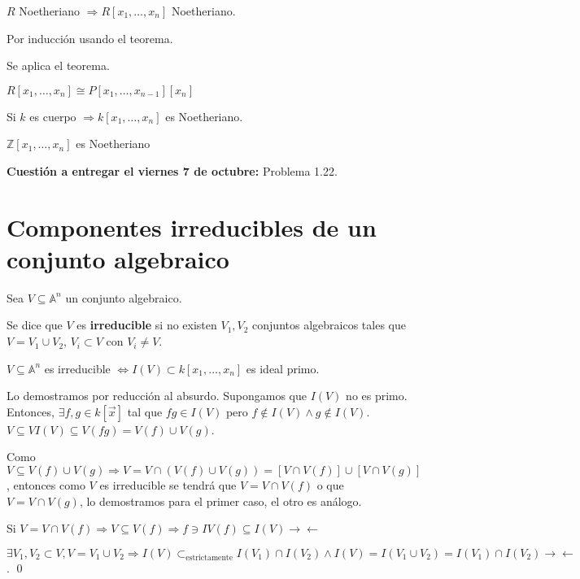 \begin{Cor}
$R$ Noetheriano $\Rightarrow R[x_1,\dots,x_n]$ Noetheriano.
\end{Cor}

\begin{Dem}
Por inducción usando el teorema.

 Se aplica el teorema.

 $R[x_1,\dots, x_n] \cong P[x_1,\dots , x_{n-1}][x_n]$
\end{Dem}

\begin{Cor}
Si $k$ es cuerpo $\Rightarrow k[x_1,\dots ,x_n]$ es Noetheriano.
\end{Cor}

\begin{Cor}
$\mathbb{Z}[x_1,\dots , x_n]$ es Noetheriano
\end{Cor}

\textbf{Cuestión a entregar el viernes 7 de octubre:} Problema 1.22.


\section{Componentes irreducibles de un conjunto algebraico}

Sea $V\subseteq \mathbb{A}^n$ un  conjunto algebraico.


\begin{Def}
Se dice que $V$ es \textbf{irreducible} si no existen $V_1,V_2$ conjuntos algebraicos tales que $V=V_1\cup V_2$, $V_i\subset V$ con $V_i \neq V$.
\end{Def}

\begin{Prop}
$V\subseteq \mathbb{A}^n$ es irreducible $\Leftrightarrow I(V)\subset k[x_1,\dots ,x_n]$ es ideal primo.
\end{Prop}

\begin{Dem}
\framebox{$\Rightarrow$}


Lo demostramos por reducción al absurdo. Supongamos que $I(V)$ no es primo. Entonces, $ \exists f,g \in k[\vec{x}]$ tal que $fg \in I(V)$ pero $f\notin I(V) \wedge g\notin I(V)$. $V\subseteq VI(V) \subseteq V(fg) =V(f)\cup V(g)$.

Como $V\subseteq V(f)\cup V(g) \Rightarrow V=V\cap (V(f)\cup V(g)) = [V\cap V(f)]\cup [V\cap V(g)]$, entonces como $V$ es irreducible se tendrá que $V=V\cap V(f)$ o que $V=V\cap V(g)$, lo demostramos para el primer caso, el otro es análogo.

Si $V=V\cap V(f) \Rightarrow V\subseteq V(f) \Rightarrow f \ni IV(f) \subseteq I(V) \rightarrow \leftarrow $

\framebox{$\Leftarrow $}


$\exists V_1,V_2 \subset V, V=V_1\cup V_2 \Rightarrow I(V)\subset_{\text{estrictamente}}I(V_1)\cap I(V_2) \wedge I(V)=I(V_1\cup V_2)=I(V_1)\cap I(V_2) \rightarrow \leftarrow$. \qed
\end{Dem}


